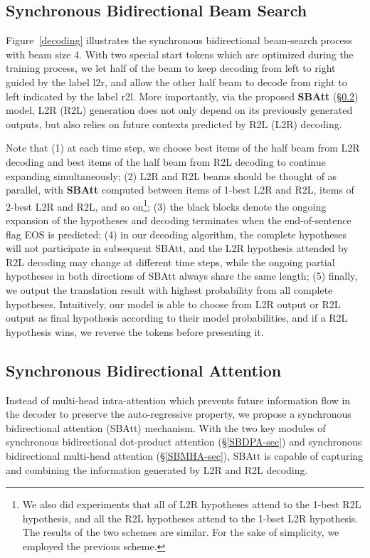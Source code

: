\documentclass[11pt,a4paper]{article}
\begin{document}
\begin{CJK*}{UTF8}{gbsn}
\subsection{Synchronous Bidirectional Beam Search} \label{SBBS-sec}
Figure~\ref{decoding} illustrates the synchronous bidirectional beam-search process with beam size 4.
With two special start tokens which are optimized during the training process, we let half of the beam to keep decoding from left to right guided by the label {l2r}, and allow the other half beam to decode from right to left indicated by the label {r2l}.
More importantly, via the proposed \textbf{SBAtt} (\S\ref{SBA-sec}) model, L2R (R2L) generation does not only depend on its previously generated outputs, but also relies on future contexts predicted by R2L (L2R) decoding.

Note that 
(1) at each time step, we choose best items of the half beam from L2R decoding and best items of the half beam from R2L decoding to continue expanding simultaneously;
(2) L2R and R2L beams should be thought of as parallel, with \textbf{SBAtt} computed between items of 1-best L2R and R2L, items of 2-best L2R and R2L, and so on{\footnote[2]{We also did experiments that all of L2R hypotheses attend to the 1-best R2L hypothesis, and all the R2L hypotheses attend to the 1-bset L2R hypothesis. The results of the two schemes are similar. For the sake of simplicity, we employed the previous scheme.}};
(3) the black blocks denote the ongoing expansion of the hypotheses and decoding terminates when the end-of-sentence flag EOS is predicted;
(4) in our decoding algorithm, the complete hypotheses will not participate in subsequent SBAtt, and the L2R hypothesis attended by R2L decoding may change at different time steps, while the ongoing partial hypotheses in both directions of SBAtt always share the same length;
(5) finally, we output the translation result with highest probability from all complete hypotheses.
Intuitively, our model is able to choose from L2R output or R2L output as final hypothesis according to their model probabilities, and if a R2L hypothesis wins, we reverse the tokens before presenting it.


\subsection{Synchronous Bidirectional Attention} \label{SBA-sec}

Instead of multi-head intra-attention which prevents future information flow in the decoder to preserve the auto-regressive property, we propose a synchronous bidirectional attention (SBAtt) mechanism.
With the two key modules of synchronous bidirectional dot-product attention (\S\ref{SBDPA-sec}) and synchronous bidirectional multi-head attention (\S\ref{SBMHA-sec}), SBAtt is capable of capturing and combining the information generated by L2R and R2L decoding.
 

\end{CJK*}
\end{document}
